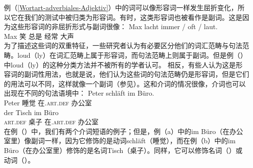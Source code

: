 例（\ref{Wortart-adverbiales-Adjektiv}）中的词可以像形容词一样发生屈折变化，所以它在我们的测试中被归类为形容词。有时，这类形容词也被看作是副词。这是因为这些形容词的非屈折形式与副词很像：
\ea
\gll Max lacht immer / oft / laut.\\
	 Max 笑 总是 {} 经常 {} 大声\\
\z
%
为了描述这些词的双重特征，一些研究者认为有必要区分他们的词汇范畴与句法范畴。loud（ly）在词汇范畴上属于形容词，而句法范畴上则属于副词。但是例（）中loud（ly）的这种分类方法并不被所有的学者认可。
相反，有些人认为这是形容词的副词性用法，也就是说，他们认为这些词的句法范畴仍是形容词，但是它们的用法可以不同，这样就像一个副词（参见\citealp[\S~7.3]{Eisenberg2004a}）。这和介词的情况很像，介词也可以出现在不同的句法语境中：
\eal
\ex 
\gll Peter schläft im Büro.\\
     Peter 睡觉 在.\textsc{art}.\textsc{def} 办公室\\
\ex 
\gll der Tisch im Büro\\
     \textsc{art}.\textsc{def} 桌子 在.\textsc{art}.\textsc{def} 办公室\\
\zl
在例（）中，我们有两个介词短语的例子；但是，例（a）中的im Büro（在办公室里）像副词一样，因为它修饰的是动词schläft（睡觉），而在例（b）中的im Büro（在办公室里）修饰的是名词Tisch（桌子）。同样，它可以修饰名词（）或动词（）。
